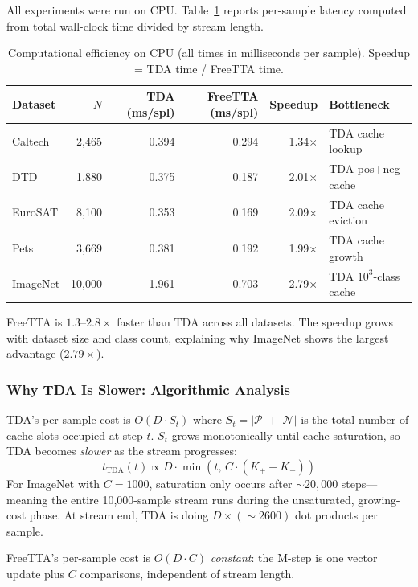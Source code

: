\documentclass[12pt,a4paper]{article}
\newcommand{\1}{\mathbf{1}}
\begin{document}
All experiments were run on CPU.
Table~\ref{tab:efficiency} reports per-sample latency computed from total wall-clock time divided
by stream length.

\begin{table}[H]
\centering
\caption{Computational efficiency on CPU (all times in milliseconds per sample).
Speedup = TDA time / FreeTTA time.}
\label{tab:efficiency}
\begin{tabular}{@{}lrrrrl@{}}
\toprule
Dataset & $N$ & TDA (ms/spl) & FreeTTA (ms/spl) & Speedup & Bottleneck \\
\midrule
Caltech  & 2,465  & 0.394 & 0.294 & 1.34$\times$ & TDA cache lookup  \\
DTD      & 1,880  & 0.375 & 0.187 & 2.01$\times$ & TDA pos+neg cache \\
EuroSAT  & 8,100  & 0.353 & 0.169 & 2.09$\times$ & TDA cache eviction \\
Pets     & 3,669  & 0.381 & 0.192 & 1.99$\times$ & TDA cache growth \\
ImageNet & 10,000 & 1.961 & 0.703 & 2.79$\times$ & TDA $10^3$-class cache \\
\bottomrule
\end{tabular}
\end{table}

FreeTTA is $1.3$--$2.8\times$ faster than TDA across all datasets.
The speedup grows with dataset size and class count, explaining why ImageNet shows the largest
advantage ($2.79\times$).

\subsubsection{Why TDA Is Slower: Algorithmic Analysis}

TDA's per-sample cost is $O(D \cdot S_t)$ where $S_t = |\mathcal{P}| + |\mathcal{N}|$ is the
total number of cache slots occupied at step $t$.
$S_t$ grows monotonically until cache saturation, so TDA becomes \emph{slower} as the stream
progresses:
\begin{equation}
  t_\text{TDA}(t) \propto D \cdot \min(t,\, C \cdot (K_+ + K_-))
\end{equation}
For ImageNet with $C = 1000$, saturation only occurs after $\sim\!20{,}000$ steps---meaning
the entire 10,000-sample stream runs during the unsaturated, growing-cost phase.
At stream end, TDA is doing $D \times (\sim\!2600)$ dot products per sample.

FreeTTA's per-sample cost is $O(D \cdot C)$ \emph{constant}:
the M-step is one vector update plus $C$ comparisons, independent of stream length.
\end{document}
